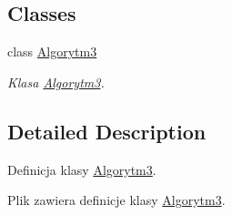\subsection*{Classes}
\begin{DoxyCompactItemize}
\item 
class \hyperlink{a00004}{Algorytm3}
\begin{DoxyCompactList}\small\item\em Klasa \hyperlink{a00004}{Algorytm3}. \end{DoxyCompactList}\end{DoxyCompactItemize}


\subsection{Detailed Description}
Definicja klasy \hyperlink{a00004}{Algorytm3}. 

Plik zawiera definicje klasy \hyperlink{a00004}{Algorytm3}. 